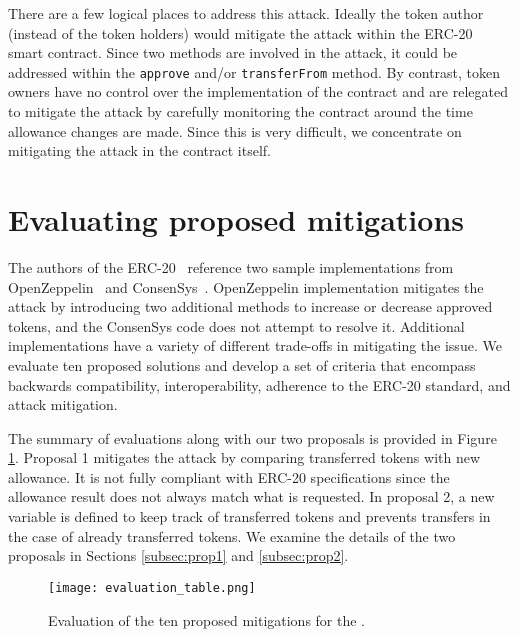 There are a few logical places to address this attack. Ideally the token author (instead of the token holders) would mitigate the attack within the ERC-20 smart contract. Since two methods are involved in the attack, it could be addressed within the \texttt{approve} and/or \texttt{transferFrom} method. By contrast, token owners have no control over the implementation of the contract and are relegated to mitigate the attack by carefully monitoring the contract around the time allowance changes are made. Since this is very difficult, we concentrate on mitigating the attack in the contract itself.

\section{Evaluating proposed mitigations}
The authors of the ERC-20~\cite{Interface} reference two sample implementations from OpenZeppelin~\cite{OpenZeppelin_Token} and ConsenSys~\cite{ConsenSys_Token}. OpenZeppelin implementation mitigates the attack by introducing two additional methods to increase or decrease approved tokens, and the ConsenSys code does not attempt to resolve it. Additional implementations have a variety of different trade-offs in mitigating the issue. We evaluate ten proposed solutions and develop a set of criteria that encompass backwards compatibility, interoperability, adherence to the ERC-20 standard, and attack mitigation. 

The summary of evaluations along with our two proposals is provided in Figure \ref{fig:mitigations}. Proposal 1 mitigates the attack by comparing transferred tokens with new allowance. It is not fully compliant with ERC-20 specifications since the allowance result does not always match what is requested. In proposal 2, a new variable is defined to keep track of transferred tokens and prevents transfers in the case of already transferred tokens. We examine the details of the two proposals in Sections \ref{subsec:prop1} and \ref{subsec:prop2}.

\begin{figure}[t]
	\centering
	\texttt{[image: evaluation\_table.png]}
	\caption[Evaluation of ten \mwa mitigation proposals]{Evaluation of the ten proposed mitigations for the \mwa.}
	\label{fig:mitigations}
\end{figure}

